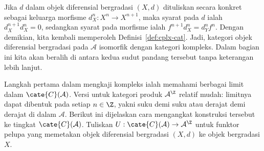 Jika $d$ dalam objek diferensial bergradasi $(X,d)$ dituliskan secara konkret
sebagai keluarga morfisme $d_X^n:X^n\to X^{n+1}$, maka syarat pada $d$ ialah
$d_X^{n+1}d_X^n=0$, sedangkan syarat pada morfisme ialah
$f^{n+1}d_X^n=d_Y^nf^n$. Dengan demikian, kita kembali memperoleh
Definisi~\ref{def:cplx-cat}. Jadi, kategori objek diferensial bergradasi pada
$\mathcal{A}$ isomorfik dengan kategori kompleks. Dalam bagian ini kita akan
beralih di antara kedua sudut pandang tersebut tanpa keterangan lebih lanjut.

Langkah pertama dalam mengkaji kompleks ialah memahami berbagai limit dalam
$\cate{C}(\mathcal{A})$. Versi untuk kategori produk $\mathcal{A}^{\Z}$
relatif mudah: limitnya dapat dibentuk pada setiap $n\in\Z$, yakni suku demi
suku atau derajat demi derajat di dalam $\mathcal{A}$. Berikut ini dijelaskan
cara mengangkat konstruksi tersebut ke tingkat $\cate{C}(\mathcal{A})$.
Tuliskan $U:\cate{C}(\mathcal{A})\to\mathcal{A}^{\Z}$ untuk funktor pelupa
yang memetakan objek diferensial bergradasi $(X,d)$ ke objek bergradasi $X$.

